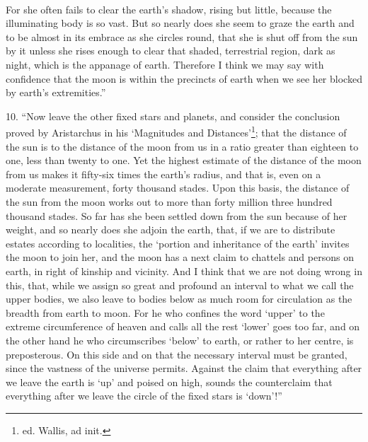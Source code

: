 \documentclass[a4paper, 11pt, oneside, polutonikogreek, english]{article}
\begin{document}
\paragraph{}
For she often fails to clear the earth's shadow, rising but little, because the illuminating body is so vast. But so nearly does she seem to graze the earth and to be almost in its embrace as she circles round, that she is shut off from the sun by it unless she rises enough to clear that shaded, terrestrial region, dark as night, which is the appanage of earth. Therefore I think we may say with confidence that the moon is within the precincts of earth when we see her blocked by earth's extremities.''

10. ``Now leave the other fixed stars and planets, and consider the conclusion proved by Aristarchus in his `Magnitudes and Distances'\footnote{ed. Wallis, ad init.}; that the distance of the sun is to the distance of the moon from us in a ratio greater than eighteen to one, less than twenty to one. Yet the highest estimate of the distance of the moon from us makes it fifty-six times the earth's radius, and that is, even on a moderate measurement, forty thousand stades. Upon this basis, the distance of the sun from the moon works out to more than forty million three hundred thousand stades. So far has she been settled down from the sun because of her weight, and so nearly does she adjoin the earth, that, if we are to distribute estates according to localities, the `portion and inheritance of the earth' invites the moon to join her, and the moon has a next claim to chattels and persons on earth, in right of kinship and vicinity. And I think that we are not doing wrong in this, that, while we assign so great and profound an interval to what we call the upper bodies, we also leave to bodies below as much room for circulation as the breadth from earth to moon. For he who confines the word `upper' to the extreme circumference of heaven and calls all the rest `lower' goes too far, and on the other hand he who circumscribes `below' to earth, or rather to her centre, is preposterous. On this side and on that the necessary interval must be granted, since the vastness of the universe permits. Against the claim that everything after we leave the earth is `up' and poised on high, sounds the counterclaim that everything after we leave the circle of the fixed stars is `down'!''
\end{document}
